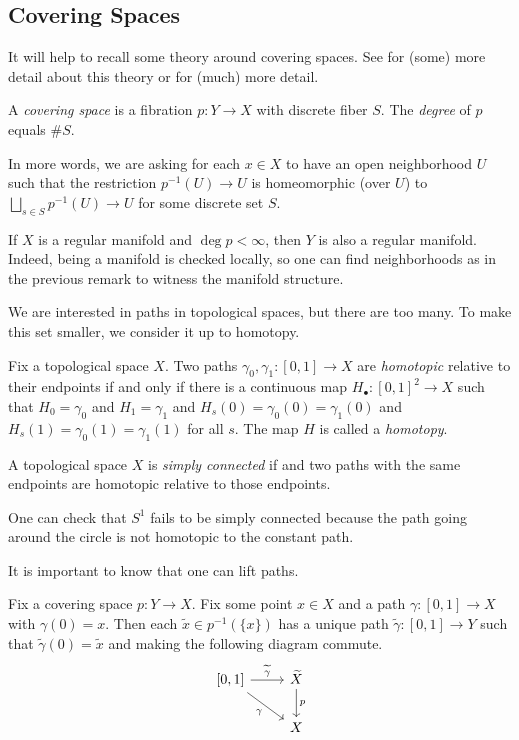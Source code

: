 \documentclass[../notes.tex]{subfiles}
\begin{document}
\subsection{Covering Spaces}
It will help to recall some theory around covering spaces. See \cite{elber-alg-top} for (some) more detail about this theory or \cite{hatcher} for (much) more detail.
\begin{definition}
	A \textit{covering space} is a fibration $p\colon Y\to X$ with discrete fiber $S$. The \textit{degree} of $p$ equals $\#S$.
\end{definition}
In more words, we are asking for each $x\in X$ to have an open neighborhood $U$ such that the restriction $p^{-1}(U)\to U$ is homeomorphic (over $U$) to $\bigsqcup_{s\in S}p^{-1}(U)\to U$ for some discrete set $S$.
\begin{remark}
	If $X$ is a regular manifold and $\deg p<\infty$, then $Y$ is also a regular manifold. Indeed, being a manifold is checked locally, so one can find neighborhoods as in the previous remark to witness the manifold structure.
\end{remark}
We are interested in paths in topological spaces, but there are too many. To make this set smaller, we consider it up to homotopy.
\begin{definition}[homotopy]
	Fix a topological space $X$. Two paths $\gamma_0,\gamma_1\colon[0,1]\to X$ are \textit{homotopic} relative to their endpoints if and only if there is a continuous map $H_\bullet\colon[0,1]^2\to X$ such that $H_0=\gamma_0$ and $H_1=\gamma_1$ and $H_s(0)=\gamma_0(0)=\gamma_1(0)$ and $H_s(1)=\gamma_0(1)=\gamma_1(1)$ for all $s$. The map $H$ is called a \textit{homotopy}.
\end{definition}
\begin{definition}
	A topological space $X$ is \textit{simply connected} if and two paths with the same endpoints are homotopic relative to those endpoints.
\end{definition}
\begin{example}
	One can check that $S^1$ fails to be simply connected because the path going around the circle is not homotopic to the constant path.
\end{example}
It is important to know that one can lift paths.
\begin{theorem}
	Fix a covering space $p\colon Y\to X$. Fix some point $x\in X$ and a path $\gamma\colon[0,1]\to X$ with $\gamma(0)=x$. Then each $\widetilde x\in p^{-1}(\{x\})$ has a unique path $\widetilde\gamma\colon[0,1]\to Y$ such that $\widetilde\gamma(0)=\widetilde x$ and making the following diagram commute.
	\[\begin{tikzcd}
		{[0,1]} & {\widetilde X} \\
		& X
		\arrow["{\widetilde\gamma}", from=1-1, to=1-2]
		\arrow["\gamma"', from=1-1, to=2-2]
		\arrow["p", from=1-2, to=2-2]
	\end{tikzcd}\]
\end{theorem}
\end{document}
